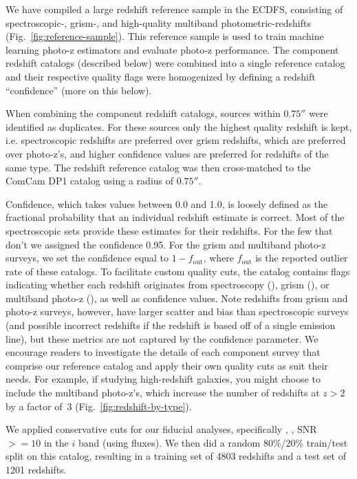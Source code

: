 We have compiled a large redshift reference sample in the ECDFS, consisting of spectroscopic-, grism-, and high-quality multiband photometric-redshifts (Fig.~\ref{fig:reference-sample}).
This reference sample is used to train machine learning photo-z estimators and evaluate photo-z performance.
The component redshift catalogs (described below) were combined into a single reference catalog and their respective quality flags were homogenized by defining a redshift ``confidence'' (more on this below).

When combining the component redshift catalogs, sources within $0.75''$ were identified as duplicates.
For these sources only the highest quality redshift is kept, i.e. spectroscopic redshifts are preferred over grism redshifts, which are preferred over photo-z's, and higher confidence values are preferred for redshifts of the same type.
The redshift reference catalog was then cross-matched to the ComCam DP1 catalog using a radius of $0.75''$.

Confidence, which takes values between 0.0 and 1.0, is loosely defined as the fractional probability that an individual redshift estimate is correct.
Most of the spectroscopic sets provide these estimates for their redshifts.
For the few that don't we assigned the confidence 0.95.
For the grism and multiband photo-z surveys, we set the confidence equal to $1 - f_\text{out}$, where $f_\text{out}$ is the reported outlier rate of these catalogs.
To facilitate custom quality cuts, the catalog contains flags indicating whether each redshift originates from spectroscopy (), grism (), or multiband photo-z (), as well as confidence values.
Note redshifts from grism and photo-z surveys, however, have larger scatter and bias than spectroscopic surveys (and possible incorrect redshifts if the redshift is based off of a single emission line), but these metrics are not captured by the confidence parameter.
We encourage readers to investigate the details of each component survey that comprise our reference catalog and apply their own quality cuts as suit their needs.
For example, if studying high-redshift galaxies, you might choose to include the multiband photo-z's, which increase the number of redshifts at $z > 2$ by a factor of~3 (Fig.~\ref{fig:redshift-by-type}).

We applied conservative cuts for our fiducial analyses, specifically , , SNR $>= 10$ in the $i$ band (using  fluxes).
We then did a random 80\%/20\% train/test split on this catalog, resulting in a training set of 4803 redshifts and a test set of 1201 redshifts.


